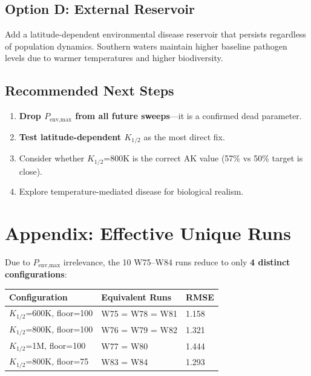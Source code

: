 \documentclass[11pt,a4paper]{article}
\begin{document}
\subsection{Option D: External Reservoir}
Add a latitude-dependent environmental disease reservoir that persists regardless of population dynamics. Southern waters maintain higher baseline pathogen levels due to warmer temperatures and higher biodiversity.

\subsection{Recommended Next Steps}
\begin{enumerate}[nosep]
    \item \textbf{Drop $P_{\text{env,max}}$ from all future sweeps}---it is a confirmed dead parameter.
    \item \textbf{Test latitude-dependent $K_{1/2}$} as the most direct fix.
    \item Consider whether $K_{1/2}$=800K is the correct AK value (57\% vs 50\% target is close).
    \item Explore temperature-mediated disease for biological realism.
\end{enumerate}


\section*{Appendix: Effective Unique Runs}

Due to $P_{\text{env,max}}$ irrelevance, the 10 W75--W84 runs reduce to only \textbf{4 distinct configurations}:

\begin{center}
\begin{tabular}{lll}
\toprule
\textbf{Configuration} & \textbf{Equivalent Runs} & \textbf{RMSE} \\
\midrule
$K_{1/2}$=600K, floor=100 & W75 = W78 = W81 & 1.158 \\
$K_{1/2}$=800K, floor=100 & W76 = W79 = W82 & 1.321 \\
$K_{1/2}$=1M, floor=100 & W77 = W80 & 1.444 \\
$K_{1/2}$=800K, floor=75 & W83 = W84 & 1.293 \\
\bottomrule
\end{tabular}
\end{center}
\end{document}
